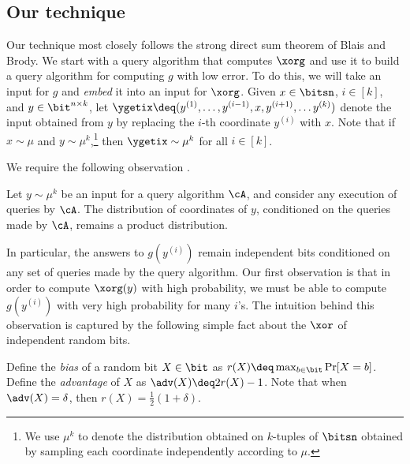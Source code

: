 \documentclass{toc}
\begin{document}
%
\subsection{Our technique}    %
Our technique most closely follows the
strong direct sum theorem of Blais and Brody.  We start with a query
algorithm that computes $\xorg$ and use it to build a query algorithm
for computing $g$ with low error.  To do this, %
we will %
take an input for
$g$ and \emph{embed} it into an input for $\xorg$.  Given
$x \in \bitsn$, $i \in [k]$, and $y \in \bit^{n\times k}$, let
$\ygetix \deq (y^{(1)}, \ldots, y^{(i-1)}, x, y^{(i+1)}, \ldots
y^{(k)})$ denote the input obtained from $y$ by replacing the $i$-th
coordinate $y^{(i)}$ with $x$.  Note that if $x \sim \mu$ and
$y \sim \mu^k$,\footnote{We use $\mu^k$ to denote the distribution
  obtained on $k$-tuples of $\bitsn$ obtained by sampling each
  coordinate independently according to $\mu$.} then
$\ygetix\sim \mu^k$ for all $i \in [k]$.

We require the following observation %
\cite[Lemma 3.2]{Drucker12}.
\begin{lemma}[Drucker]
  Let $y\sim \mu^k$ be an input for a query algorithm $\cA$, and
  consider any execution of queries by $\cA$.  The distribution of
  coordinates of $y$, conditioned on the queries made by $\cA$,
  remains a product distribution.
\end{lemma}

In particular, the answers to $g(y^{(i)})$ remain independent bits
conditioned on any set of queries made by the query algorithm.
Our first observation is that in order to compute $\xorg(y)$ with high
probability, we must be able to compute $g(y^{(i)})$ with very high
probability for many $i$'s.  The intuition behind this observation is
captured by the following simple fact about the $\xor$ of independent
random bits.

Define the \emph{bias} of a random bit $X \in \bit$ as
$r(X) \deq \max_{b\in\bit}\Pr[X=b]$.  Define the \emph{advantage} of
$X$ as $\adv(X) \deq 2r(X)-1$.  Note that when $\adv(X) = \delta$,
then $r(X) = \frac{1}{2}(1+\delta)$.
\end{document}
